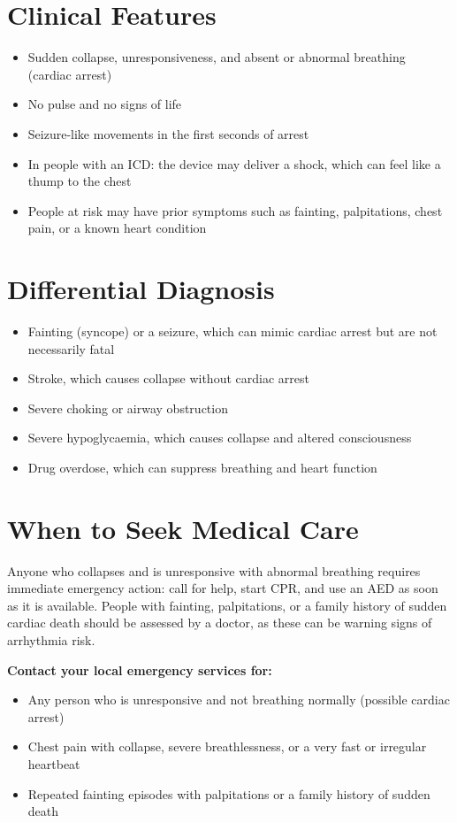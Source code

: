 \section*{Clinical Features}
\begin{itemize}
    \item Sudden collapse, unresponsiveness, and absent or abnormal breathing (cardiac arrest)
    \item No pulse and no signs of life
    \item Seizure-like movements in the first seconds of arrest
    \item In people with an ICD: the device may deliver a shock, which can feel like a thump to the chest
    \item People at risk may have prior symptoms such as fainting, palpitations, chest pain, or a known heart condition
\end{itemize}

\section*{Differential Diagnosis}
\begin{itemize}
    \item Fainting (syncope) or a seizure, which can mimic cardiac arrest but are not necessarily fatal
    \item Stroke, which causes collapse without cardiac arrest
    \item Severe choking or airway obstruction
    \item Severe hypoglycaemia, which causes collapse and altered consciousness
    \item Drug overdose, which can suppress breathing and heart function
\end{itemize}

\section*{When to Seek Medical Care}
Anyone who collapses and is unresponsive with abnormal breathing requires immediate emergency action: call for help, start CPR, and use an AED as soon as it is available. People with fainting, palpitations, or a family history of sudden cardiac death should be assessed by a doctor, as these can be warning signs of arrhythmia risk.

\textbf{Contact your local emergency services for:}
\begin{itemize}
    \item Any person who is unresponsive and not breathing normally (possible cardiac arrest)
    \item Chest pain with collapse, severe breathlessness, or a very fast or irregular heartbeat
    \item Repeated fainting episodes with palpitations or a family history of sudden death
\end{itemize}

